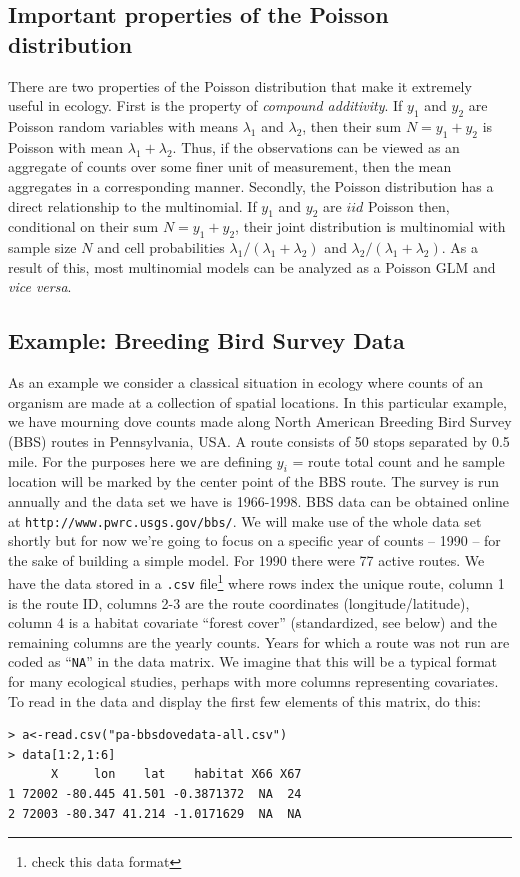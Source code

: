 \subsection{Important properties of the Poisson distribution}
\label{glms.sec.properties}

There are two properties of the Poisson distribution
that make it extremely useful in ecology. First
is the property of {\it compound additivity}. If $y_1$ and $y_2$ are
Poisson random variables with means $\lambda_1$ and $\lambda_2$,
then their sum $N=y_1+y_2$ is Poisson with mean $\lambda_1+\lambda_2$. Thus,
if the observations can be viewed as an aggregate of counts over some
finer unit of measurement, then the mean aggregates in a corresponding
manner.
Secondly, the Poisson distribution has a direct relationship to the multinomial.
If $y_1$ and $y_2$ are $iid$ Poisson then,
conditional on their sum $N = y_1 + y_2$, their joint distribution is multinomial
 with sample size $N$ and cell probabilities
$\lambda_1/(\lambda_1+\lambda_2)$ and
$\lambda_2/(\lambda_1+\lambda_2)$.  As a result of this, most
multinomial models can be analyzed as a Poisson GLM and {\it vice versa}.

\subsection{Example: Breeding Bird Survey Data}

As an example we consider a classical situation in ecology where
counts of an organism are made at a collection of spatial
locations. In this particular example, we have mourning dove counts
made along North American Breeding Bird Survey (BBS) routes in
Pennsylvania, USA. A route consists of 50 stops separated by 0.5
mile. For the purposes here we are defining $y_i$ = route total count
and he sample location will be marked by the center point of the BBS
route.  The survey is run annually and the data set we have is
1966-1998. BBS data can be obtained online at \mbox{\tt http:\//\//www.pwrc.usgs.gov\//bbs\//}.
We will make use of the whole data set shortly but for now we're going
to focus on a specific year of counts -- 1990 -- for the sake of
building a simple model.
 For 1990 there were 77 active routes. We have the data stored
in a \mbox{\tt .csv} file\footnote{check this data format} where rows index the unique route, column 1 is the
route ID, columns 2-3 are the route coordinates (longitude/latitude),
column 4 is a habitat covariate ``forest cover'' (standardized, see
below) and the remaining columns are the yearly counts. Years for
which a route was not run are coded as ``\mbox{\tt NA}'' in the data matrix. We
imagine that this will be a typical format for many ecological
studies, perhaps with more columns representing covariates.  To read
in the data and display the first few elements of this matrix, do
this:
{\small
\begin{verbatim}
> a<-read.csv("pa-bbsdovedata-all.csv")
> data[1:2,1:6]
      X     lon    lat    habitat X66 X67
1 72002 -80.445 41.501 -0.3871372  NA  24
2 72003 -80.347 41.214 -1.0171629  NA  NA
\end{verbatim}
}

